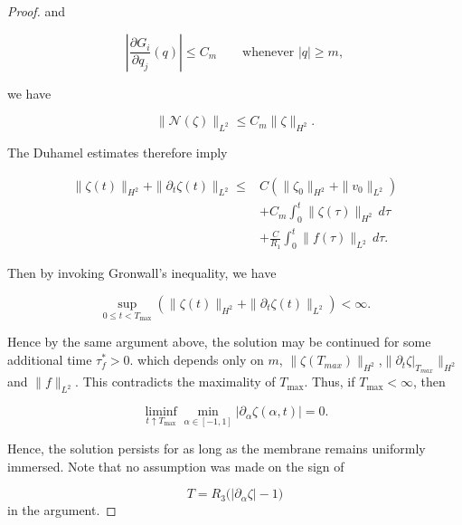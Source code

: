 \documentclass[10pt,a4paper]{amsart}
\begin{document}
\begin{proof}
and

$$
    \left|
        \frac{\partial G_i}{\partial q_j}(q)
    \right|
    \leq C_m
    \qquad\text{whenever }|q|\geq m,
$$

we have

$$
    \|\mathcal N(\zeta)\|_{L^2}
    \leq C_m\|\zeta\|_{H^2}.
$$

The Duhamel estimates therefore imply

$$
\begin{aligned}
    \|\zeta(t)\|_{H^2}
    +\|\partial_t\zeta(t)\|_{L^2}
    \leq{}&
    C\left(
        \|\zeta_0\|_{H^2}
        +\|v_0\|_{L^2}
    \right)\\
    &+
    C_m\int_0^t
    \|\zeta(\tau)\|_{H^2}\,d\tau\\
    &+
    \frac{C}{R_1}
    \int_0^t
    \|f(\tau)\|_{L^2}\,d\tau.
\end{aligned}
$$

Then by invoking Gronwall's inequality, we have 

$$
    \sup_{0\leq t<T_{\max}}
    \left(
        \|\zeta(t)\|_{H^2}
        +\|\partial_t\zeta(t)\|_{L^2}
    \right)<\infty.
$$

Hence by the same argument above, the solution may be continued for some additional time $\tau_f^* > 0$. which depends only on $m$, $\|\zeta(T_{max})\|_{H^2}$,$\|\partial_t\zeta|_{T_{max}}\|_{H^2}$ and $\|f\|_{L^2}$. This contradicts the maximality of \(T_{\max}\). Thus, if \(T_{\max}<\infty\), then

$$
    \liminf_{t\uparrow T_{\max}}
    \min_{\alpha\in[-1,1]}
    |\partial_\alpha\zeta(\alpha,t)|=0.
$$

Hence, the solution persists for as long as the membrane remains uniformly immersed. Note that no assumption was made on the sign of

$$
    T=R_3\bigl(|\partial_\alpha\zeta|-1\bigr)
$$
in the argument.
\end{proof}
\end{document}
